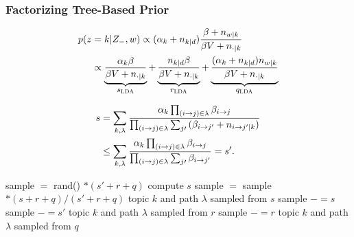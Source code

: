 \begin{frame}

	\frametitle{Factorizing Tree-Based Prior}


\begin{align}
\label{eq:fast-lda}
p(z &= k | Z_{-}, w) \propto (\alpha_k + n_{k|d})\frac{\beta + n_{w|k}}{\beta V + n_{\cdot |k}} \\
&\propto \explain{$s_{\textsc{LDA}}$}{\frac{\alpha_k \beta}{\beta V + n_{\cdot |k}}} + \explain{$r_{\textsc{LDA}}$}{\frac{n_{k|d} \beta}{\beta V + n_{\cdot |k}}}
+ \explain{$q_{\textsc{LDA}}$}{\frac{(\alpha_k + n_{k|d})n_{w | k}}{\beta V +
    n_{\cdot |k}}} \notag
\end{align}
\pause

\begin{align}
\label{eq:smoothing}
s &= \sum_{k,\lambda} \frac{\alpha_k \prod_{(i \rightarrow j)\in \lambda}{\beta_{i \rightarrow j}}}{\prod_{(i \rightarrow j)\in \lambda} {\sum_{j\prime}{(\beta_{i \rightarrow j'} + n_{i \rightarrow j' | k})}}} \notag \\
&\le \sum_{k,\lambda} \frac{\alpha_k \prod_{(i \rightarrow j)\in \lambda}{\beta_{i \rightarrow j}}}{\prod_{(i \rightarrow j)\in \lambda} {\sum_{j\prime}{\beta_{i \rightarrow j'}}}} = s'.
\end{align}




\end{frame}

\begin{frame}[fragile]

\begin{small}
\begin{algorithmic}[1]
\STATE sample $=$ rand() $* (s' + r + q)$
\STATE compute $s$
\STATE sample $=$ sample $* (s+r+q) / (s'+r+q)$
\RETURN topic $k$ and path $\lambda$ sampled from $s$
\ENDIF
\STATE sample $-= s$
\ELSE
\STATE sample $-= s'$
\ENDIF
{}
\RETURN topic $k$ and path $\lambda$ sampled from $r$
\ENDIF
\STATE sample $-= r$
\RETURN topic $k$ and path $\lambda$ sampled from $q$
\ENDFOR
\end{algorithmic}
\end{small}

\end{frame}

